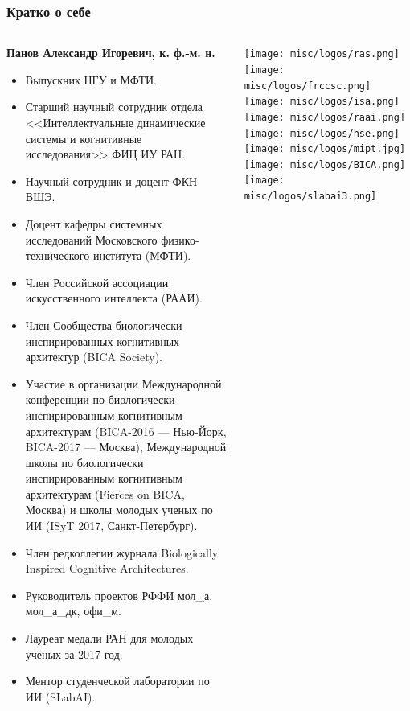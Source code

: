 \documentclass[default]{beamer}
\begin{document}
	\begin{frame}
		\frametitle{Кратко о себе}
		\scriptsize
		\begin{columns}
			\begin{column}{0.85\textwidth}
				\textbf{Панов Александр Игоревич, к. ф.-м. н.}
				\begin{itemize}
					\item Выпускник НГУ и МФТИ.
					\item Старший научный сотрудник отдела <<Интеллектуальные динамические системы и когнитивные исследования>> ФИЦ ИУ РАН.
					\item Научный сотрудник и доцент ФКН ВШЭ.
					\item Доцент кафедры системных исследований Московского физико-технического института (МФТИ).
					\item Член Российской ассоциации искусственного интеллекта (РААИ).
					\item Член Сообщества биологически инспирированных когнитивных архитектур (BICA Society).
					\item Участие в организации Международной конференции по биологически инспирированным когнитивным архитектурам (BICA-2016 --- Нью-Йорк, BICA-2017 --- Москва), Международной школы по биологически инспирированным когнитивным архитектурам (Fierces on BICA, Москва) и школы молодых ученых по ИИ (ISyT 2017, Санкт-Петербург).
					\item Член редколлегии журнала Biologically Inspired Cognitive Architectures.					
					\item Руководитель проектов РФФИ мол\_а, мол\_а\_дк, офи\_м.
					\item Лауреат медали РАН для молодых ученых за 2017 год.
					\item Ментор студенческой лаборатории по ИИ (SLabAI).
				\end{itemize}
			\end{column}
			
			\begin{column}{0.15\textwidth}
				\centering
				\texttt{[image: misc/logos/ras.png]}
				\vspace{7pt}
				\texttt{[image: misc/logos/frccsc.png]}
				\vspace{7pt}
				\texttt{[image: misc/logos/isa.png]}
				\vspace{7pt}
				\texttt{[image: misc/logos/raai.png]}
				\vspace{7pt}
				\texttt{[image: misc/logos/hse.png]}
				\vspace{7pt}
				\texttt{[image: misc/logos/mipt.jpg]}
				\vspace{5pt}
				\texttt{[image: misc/logos/BICA.png]}
				\vspace{5pt}
				\texttt{[image: misc/logos/slabai3.png]}
			\end{column}
			
		\end{columns}
	\end{frame}
\end{document}
